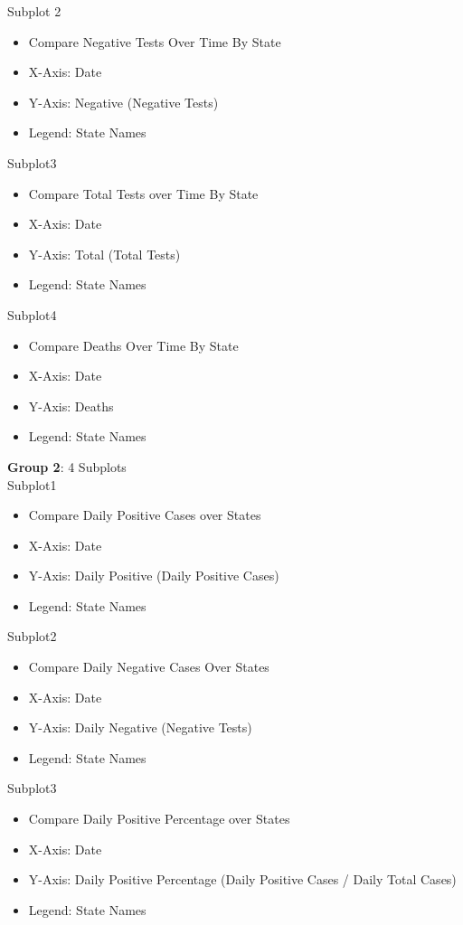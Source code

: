 \documentclass[11pt]{article}
\begin{document}
\noindent
Subplot 2
\begin{itemize}
    \item Compare Negative Tests Over Time By State
    \item X-Axis: Date
    \item Y-Axis: Negative (Negative Tests)
    \item Legend: State Names
\end{itemize}

\noindent
Subplot3
\begin{itemize}
    \item Compare Total Tests over Time By State
    \item X-Axis: Date
    \item Y-Axis: Total (Total Tests)
    \item Legend: State Names
\end{itemize}

\noindent
Subplot4
\begin{itemize}
    \item Compare Deaths Over Time By State
    \item X-Axis: Date
    \item Y-Axis: Deaths
    \item Legend: State Names
\end{itemize}

\pagebreak

\noindent
\textbf{Group 2}: 4 Subplots \\

\noindent
Subplot1
\begin{itemize}
    \item Compare Daily Positive Cases over States
    \item X-Axis: Date
    \item Y-Axis: Daily Positive (Daily Positive Cases)
    \item Legend: State Names
\end{itemize}

\noindent
Subplot2
\begin{itemize}
    \item Compare Daily Negative Cases Over States
    \item X-Axis: Date
    \item Y-Axis: Daily Negative (Negative Tests)
    \item Legend: State Names
\end{itemize}

\noindent
Subplot3
\begin{itemize}
    \item Compare Daily Positive Percentage over States
    \item X-Axis: Date
    \item Y-Axis: Daily Positive Percentage (Daily Positive Cases / Daily Total Cases)
    \item Legend: State Names
\end{itemize}
\end{document}
